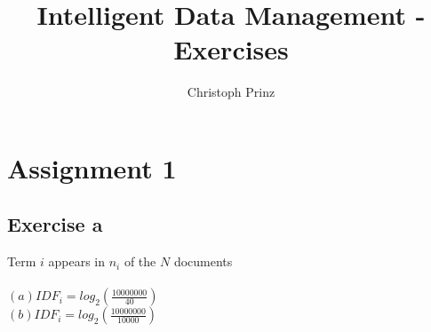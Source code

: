 \documentclass[]{scrartcl}
\title{Intelligent Data Management - Exercises}
\author{Christoph Prinz}
\begin{document}
\maketitle


\section{Assignment 1}

\subsection{Exercise a}

Term $i$ appears in $n_i$ of the $N$ documents \\\\
$ (a) IDF_i = log_2(\frac{10000000}{40})$\\
$ (b) IDF_i = log_2(\frac{10000000}{10000})$
\end{document}
